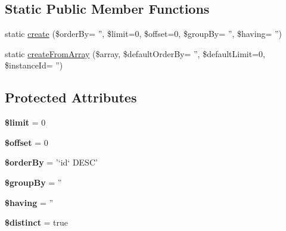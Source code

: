 \subsection*{Static Public Member Functions}
\begin{DoxyCompactItemize}
\item 
static \hyperlink{classTk_1_1Db_1_1Tool_a1888c74636a5560902b35b03f861ad4a}{create} (\$order\+By= '', \$limit=0, \$offset=0, \$group\+By= '', \$having= '')
\item 
static \hyperlink{classTk_1_1Db_1_1Tool_afeee02cb0db87e8385dcd041d4e75bad}{create\+From\+Array} (\$array, \$default\+Order\+By= '', \$default\+Limit=0, \$instance\+Id= '')
\end{DoxyCompactItemize}
\subsection*{Protected Attributes}
\begin{DoxyCompactItemize}
\item 
\hypertarget{classTk_1_1Db_1_1Tool_a54263eba37d390b53dff1c0a694f573d}{{\bfseries \$limit} = 0}\label{classTk_1_1Db_1_1Tool_a54263eba37d390b53dff1c0a694f573d}

\item 
\hypertarget{classTk_1_1Db_1_1Tool_ab71ae5f22b76ffbea1588e7b8997d6db}{{\bfseries \$offset} = 0}\label{classTk_1_1Db_1_1Tool_ab71ae5f22b76ffbea1588e7b8997d6db}

\item 
\hypertarget{classTk_1_1Db_1_1Tool_a01b38f7290cafca93c1e80a17f3e777c}{{\bfseries \$order\+By} = '`id` D\+E\+S\+C'}\label{classTk_1_1Db_1_1Tool_a01b38f7290cafca93c1e80a17f3e777c}

\item 
\hypertarget{classTk_1_1Db_1_1Tool_a143f4c3c30b671231a741ebddd66b4a3}{{\bfseries \$group\+By} = ''}\label{classTk_1_1Db_1_1Tool_a143f4c3c30b671231a741ebddd66b4a3}

\item 
\hypertarget{classTk_1_1Db_1_1Tool_ae5402895ad26841ec4b80dadd4f53dc7}{{\bfseries \$having} = ''}\label{classTk_1_1Db_1_1Tool_ae5402895ad26841ec4b80dadd4f53dc7}

\item 
\hypertarget{classTk_1_1Db_1_1Tool_aa233d208da44fb01f9595d426ddbc820}{{\bfseries \$distinct} = true}\label{classTk_1_1Db_1_1Tool_aa233d208da44fb01f9595d426ddbc820}

\end{DoxyCompactItemize}


